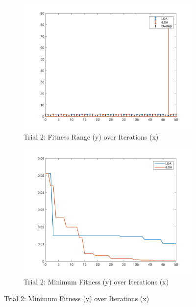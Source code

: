 \begin{figure}
  \begin{subfigure}[b]{0.4\textwidth}
    \includegraphics[width=\textwidth]{img/bars/f5/2}
    \caption{ \scriptsize Trial 2: Fitness Range (y) over Iterations (x)}
    \label{fig:f5-b-2}
  \end{subfigure}
  \begin{subfigure}[b]{0.4\textwidth}
    \includegraphics[width=\textwidth]{img/fits/f5/2}
    \caption{ \scriptsize Trial 2: Minimum Fitness (y) over Iterations (x)}
    \label{fig:f5-f-2}
  \end{subfigure}


\end{figure}
